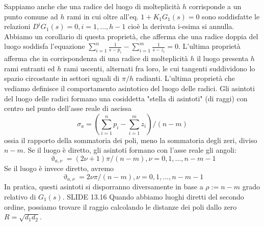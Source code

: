 \documentclass[11pt]{article}
\begin{document}
Sappiamo anche che una radice del luogo di molteplicità $h$ corrisponde a un punto comune ad $h$ rami in cui oltre all'eq. $1+K_1G_1(s)=0$ sono soddisfatte le relazioni $D^i G_1(s) = 0,i=1,\dots,h-1$ cioè la derivata i-esima si annulla. Abbiamo un corollario di questa proprietà, che afferma che una radice doppia del luogo soddisfa l'equazione $\sum_{i=1}^n \frac{1}{s-p_i} -\sum_{i=1}^m \frac{1}{s-z_i} = 0$. L'ultima proprietà afferma che in corrispondenza di una radice di molteplicità $h$ il luogo presenta $h$ rami entranti ed $h$ rami uscenti, alternati fra loro, le cui tangenti suddividono lo spazio circostante in settori uguali di $\pi/h$ radianti. 
L'ultima proprietà che vediamo definisce il comportamento asintotico del luogo delle radici. Gli asintoti del luogo delle radici formano una cosiddetta "stella di asintoti" (di raggi) con centro nel punto dell'asse reale di ascissa
\begin{displaymath}
    \sigma_a = \left(\sum_{i=1}^n p_i - \sum_{i=1}^m z_i\right) / (n-m)
\end{displaymath}
ossia il rapporto della sommatoria dei poli, meno la sommatoria degli zeri, diviso $n-m$. Se il luogo è diretto, gli asintoti formano con l'asse reale gli angoli:
\begin{displaymath}
    \upvartheta_{a,\nu } = (2\nu +1)\pi / (n-m), \nu =0,1,\dots,n-m-1
\end{displaymath}
Se il luogo è invece diretto, avremo
\begin{displaymath}
    \upvartheta_{a,\nu} = 2\nu\pi/ (n-m), \nu=0,1,\dots,n-m-1
\end{displaymath}
In pratica, questi asintoti si disporranno diversamente in base a $\rho:=n-m$ grado relativo di $G_1(s)$. 
SLIDE 13.16
Quando abbiamo luoghi diretti del secondo ordine, possiamo trovare il raggio calcolando le distanze dei poli dallo zero $R=\sqrt{d_1d_2}$.
\end{document}

